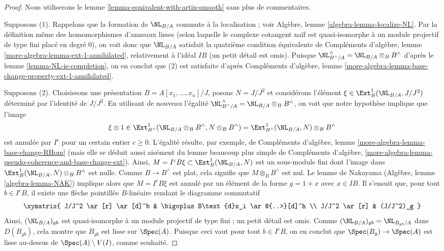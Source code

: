 \begin{proof}
Nous utiliserons le lemme \ref{lemma-equivalent-with-artin-smooth} sans plus
de commentaires.

\medskip\noindent
Supposons (1). Rappelons que la formation de $\NL_{B/A}$ commute à la
localisation ; voir Algèbre, lemme \ref{algebra-lemma-localize-NL}. Par la
définition même des homomorphismes d'anneaux lisses (selon laquelle le complexe
cotangent naïf est quasi-isomorphe à un module projectif de type fini placé en
degré $0$), on voit donc que $\NL_{B/A}$ satisfait la quatrième condition
équivalente de Compléments d'algèbre, lemme
\ref{more-algebra-lemma-ext-1-annihilated}, relativement à l'idéal $IB$ (un
petit détail est omis). Puisque
$\NL_{B^\wedge/A}^\wedge = \NL_{B/A} \otimes_B B^\wedge$ d'après le lemme
\ref{lemma-NL-is-completion}, on en conclut que (2) est satisfaite d'après
Compléments d'algèbre, lemme
\ref{more-algebra-lemma-base-change-property-ext-1-annihilated}.

\medskip\noindent
Supposons (2). Choisissons une présentation
$B = A[x_1, \ldots, x_n]/J$, posons $N = J/J^2$ et considérons l'élément
$\xi \in \Ext^1_B(\NL_{B/A}, J/J^2)$ déterminé par l'identité de $J/J^2$.
En utilisant de nouveau l'égalité
$\NL_{B^\wedge/A}^\wedge = \NL_{B/A} \otimes_B B^\wedge$, on voit que notre
hypothèse implique que l'image
$$
\xi \otimes 1 \in
\Ext^1_{B^\wedge}(\NL_{B/A} \otimes_B B^\wedge, N \otimes_B B^\wedge) =
\Ext^1_{B^\wedge}(\NL_{B/A}, N) \otimes_B B^\wedge
$$
est annulée par $I^c$ pour un certain entier $c \geq 0$. L'égalité résulte,
par exemple, de Compléments d'algèbre, lemme
\ref{more-algebra-lemma-base-change-RHom} (mais elle se déduit aussi aisément
du lemme beaucoup plus simple de Compléments d'algèbre,
\ref{more-algebra-lemma-pseudo-coherence-and-base-change-ext}). Ainsi,
$M = I^cB\xi \subset \Ext^1_B(\NL_{B/A}, N)$ est un sous-module fini dont
l'image dans $\Ext^1_B(\NL_{B/A}, N) \otimes_B B^\wedge$ est nulle. Comme
$B \to B^\wedge$ est plat, cela signifie que $M \otimes_B B^\wedge$ est nul.
Le lemme de Nakayama (Algèbre, lemme \ref{algebra-lemma-NAK}) implique alors
que $M = I^cB\xi$ est annulé par un élément de la forme $g = 1 + x$ avec
$x \in IB$. Il s'ensuit que, pour tout $b \in I^cB$, il existe une flèche
pointillée $B$-linéaire rendant le diagramme commutatif
$$
\xymatrix{
J/J^2 \ar[r] \ar[d]^b & \bigoplus B\text{d}x_i \ar@{..>}[d]^h \\
J/J^2 \ar[r] & (J/J^2)_g
}
$$
Ainsi, $(\NL_{B/A})_{gb}$ est quasi-isomorphe à un module projectif de type
fini ; un petit détail est omis. Comme
$(\NL_{B/A})_{gb} = \NL_{B_{gb}/A}$ dans $D(B_{gb})$, cela montre que
$B_{gb}$ est lisse sur $\Spec(A)$. Puisque ceci vaut pour tout $b \in I^cB$,
on en conclut que $\Spec(B_g) \to \Spec(A)$ est lisse au-dessus de
$\Spec(A) \setminus V(I)$, comme souhaité.
\end{proof}

